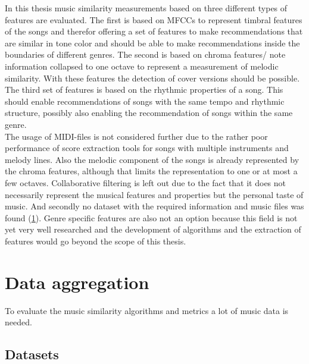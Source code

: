 In this thesis music similarity measurements based on three different types of features are evaluated. 
The first is based on MFCCs to represent timbral features of the songs and therefor offering a set of features to make recommendations that are similar in tone color and should be able to make recommendations inside the boundaries of different genres.
The second is based on chroma features/ note information collapsed to one octave to represent a measurement of melodic similarity. With these features the detection of cover versions should be possible.  
The third set of features is based on the rhythmic properties of a song. This should enable recommendations of songs with the same tempo and rhythmic structure, possibly also enabling the recommendation of songs within the same genre.
\ \\
The usage of MIDI-files is not considered further due to the rather poor performance of score extraction tools for songs with multiple instruments and melody lines. Also the melodic component of the songs is already represented by the chroma features, although that limits the representation to one or at most a few octaves. 
Collaborative filtering is left out due to the fact that it does not necessarily represent the musical features and properties but the personal taste of music. And secondly no dataset with the required information and music files was found (\ref{data}). 
Genre specific features are also not an option because this field is not yet very well researched and the development of algorithms and the extraction of features would go beyond the scope of this thesis.

\section{Data aggregation}\label{data}

To evaluate the music similarity algorithms and metrics a lot of music data is needed.

\subsection{Datasets}\label{datasets}

